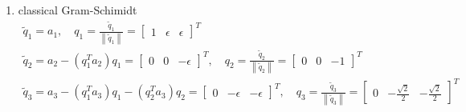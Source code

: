 \documentclass[english,onecolumn]{IEEEtran}
\begin{document}
\begin{enumerate}
	\item
classical Gram-Schimidt
$$
\begin{array}{c}
	\tilde{q}_{1}=a_{1}, \quad q_{1}=\frac{\tilde{q}_{1}}{\left\|\tilde{q}_{1}\right\|}=\left[\begin{array}{ccc}
		1 & \epsilon & \epsilon
	\end{array}\right]^{T} \\
	\tilde{q}_{2}=a_{2}-\left(q_{1}^{T} a_{2}\right) q_{1}=\left[\begin{array}{ccc}
		0 & 0 & -\epsilon
	\end{array}\right]^{T}, \quad q_{2}=\frac{\tilde{q}_{2}}{\left\|\tilde{q}_{2}\right\|}=\left[\begin{array}{ccc}
		0 & 0 & -1
	\end{array}\right]^{T} \\
	\tilde{q}_{3}=a_{3}-\left(q_{1}^{T} a_{3}\right) q_{1}-\left(q_{2}^{T} a_{3}\right) q_{2}=\left[\begin{array}{ccc}
		0 & -\epsilon & -\epsilon
	\end{array}\right]^{T}, \quad q_{3}=\frac{\tilde{q}_{3}}{\left\|\tilde{q}_{3}\right\|}=
\left[\begin{array}{ccc}
		0 & -\frac{\sqrt{2}}{2} & -\frac{\sqrt{2}}{2}
	\end{array}\right]^{T}
\end{array}
$$


\end{enumerate}
\end{document}
